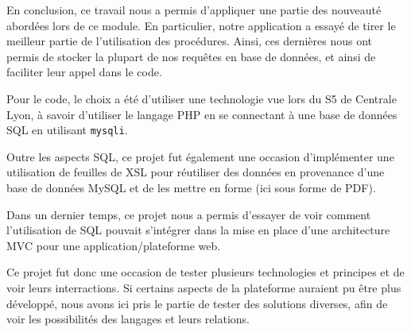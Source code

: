 En conclusion, ce travail nous a permis d'appliquer une partie des nouveauté abordées lors de ce module. En particulier, notre application a essayé de tirer le meilleur partie de l'utilisation des procédures. Ainsi, ces dernières nous ont permis de stocker la plupart de nos requêtes en base de données, et ainsi de faciliter leur appel dans le code.

Pour le code, le choix a été d'utiliser une technologie vue lors du S5 de Centrale Lyon, à savoir d'utiliser le langage PHP en se connectant à une base de données SQL en utilisant \texttt{mysqli}.

Outre les aspects SQL, ce projet fut également une occasion d'implémenter une utilisation de feuilles de XSL pour réutiliser des données en provenance d'une base de données MySQL et de les mettre en forme (ici sous forme de PDF).

Dans un dernier temps, ce projet nous a permis d'essayer de voir comment l'utilisation de SQL pouvait s'intégrer dans la mise en place d'une architecture MVC pour une application/plateforme web.

Ce projet fut donc une occasion de tester plusieurs technologies et principes et de voir leurs interractions. Si certains aspects de la plateforme auraient pu être plus développé, nous avons ici pris le partie de tester des solutions diverses, afin de voir les possibilités des langages et leurs relations.

